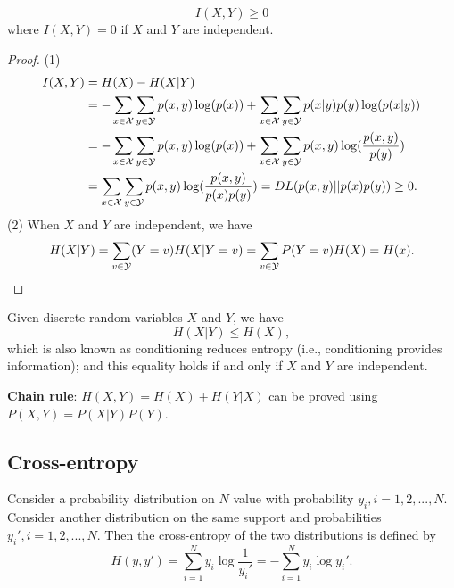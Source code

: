 \begin{refsection}
\begin{lemma}
	$$I(X,Y) \geq 0$$
	where $I(X,Y) = 0$ if $X$ and $Y$ are independent.
\end{lemma}
\begin{proof}
	(1)
	\begin{align*}
	I(X,Y)&=H(X)-H(X|Y)\\
	&=-\sum_{x\in \mathcal{X}}\sum_{y\in \mathcal{Y}}p(x,y)\log(p(x)) + \sum_{x\in \mathcal{X}}\sum_{y\in \mathcal{Y}} p(x|y)p(y)\log(p(x|y))\\
	& = -\sum_{x\in \mathcal{X}}\sum_{y\in \mathcal{Y}}p(x,y)\log(p(x)) + \sum_{x\in \mathcal{X}}\sum_{y\in \mathcal{Y}} p(x,y)\log(\frac{p(x,y)}{p(y)})\\
	& = \sum_{x\in \mathcal{X}}\sum_{y\in \mathcal{Y}} p(x,y)\log(\frac{p(x,y)}{p(x)p(y)}) = DL(p(x,y)||p(x)p(y)) \geq 0.
	\end{align*}
	(2) When $X$ and $Y$ are independent, we have
	$$H(X|Y) = \sum_{v\in \mathcal{Y}}(Y=v)H(X|Y=v) = \sum_{v\in \mathcal{Y}}P(Y=v)H(X) = H(x).$$
\end{proof}




\begin{corollary}
	Given discrete random variables $X$ and $Y$, we have
	$$H(X|Y) \leq H(X),$$ which is also known as conditioning reduces entropy (i.e., conditioning provides information); and this equality holds if and only if $X$ and $Y$ are independent.\\	
\end{corollary}


\textbf{Chain rule}: $H(X,Y)=H(X)+H(Y|X)$ can be proved using $P(X,Y)=P(X|Y)P(Y)$.



\subsection{Cross-entropy}

\begin{definition}
	Consider a probability distribution on $N$ value with probability $y_i, i=1,2,...,N$. Consider another distribution on the same support and probabilities $y_i', i = 1,2,...,N$. Then the cross-entropy of the two distributions is defined by
	$$H(y,y') = \sum_{i=1}^N y_i \log \frac{1}{y_i'} = -\sum_{i=1}^N y_i \log y_i'.$$ 	
\end{definition}



\end{refsection}
